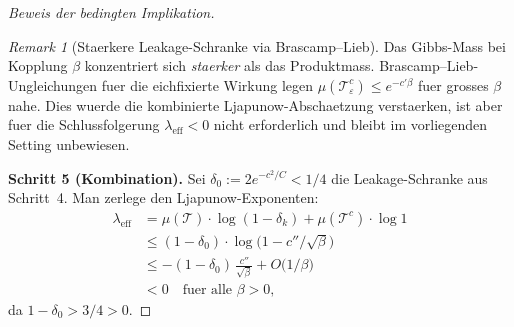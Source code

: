\documentclass[12pt,a4paper]{article}
\theoremstyle{definition}
\theoremstyle{plain}
\theoremstyle{remark}
\newtheorem{remark}[definition]{Remark}
\begin{document}
\begin{proof}[Beweis der bedingten Implikation]
\begin{remark}[Staerkere Leakage-Schranke via Brascamp--Lieb]
Das Gibbs-Mass bei Kopplung $\beta$ konzentriert sich \emph{staerker}
als das Produktmass. Brascamp--Lieb-Ungleichungen fuer die
eichfixierte Wirkung legen $\mu(\mathcal{T}_\varepsilon^c) \leq e^{-c'\beta}$
fuer grosses $\beta$ nahe. Dies wuerde die kombinierte Ljapunow-Abschaetzung
verstaerken, ist aber fuer die Schlussfolgerung $\lambda_{\mathrm{eff}} < 0$
nicht erforderlich und bleibt im vorliegenden Setting unbewiesen.
\end{remark}

\medskip
\textbf{Schritt 5 (Kombination).}
Sei $\delta_0 := 2e^{-c^2/C} < 1/4$ die Leakage-Schranke aus Schritt~4.
Man zerlege den Ljapunow-Exponenten:
\begin{align*}
  \lambda_{\mathrm{eff}}
  &= \mu(\mathcal{T}) \cdot \log(1 - \delta_k) + \mu(\mathcal{T}^c) \cdot \log 1 \\
  &\leq (1 - \delta_0) \cdot \log\!\bigl(1 - c''/\sqrt{\beta}\bigr) \\
  &\leq -(1 - \delta_0)\,\frac{c''}{\sqrt{\beta}}
    + O\!\bigl(1/\beta\bigr) \\
  &< 0 \quad\text{fuer alle } \beta > 0,
\end{align*}
da $1 - \delta_0 > 3/4 > 0$. \qedhere
\end{proof}
\end{document}
